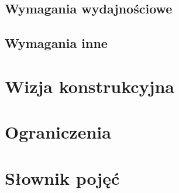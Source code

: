 \documentclass[11pt,oneside,a4paper,titlepage,onecolumn]{article}
\begin{document}
\subsection{Wymagania wydajnościowe}

\subsection{Wymagania inne}

\section{Wizja konstrukcyjna}

\section{Ograniczenia}

\section{Słownik pojęć}
\end{document}
